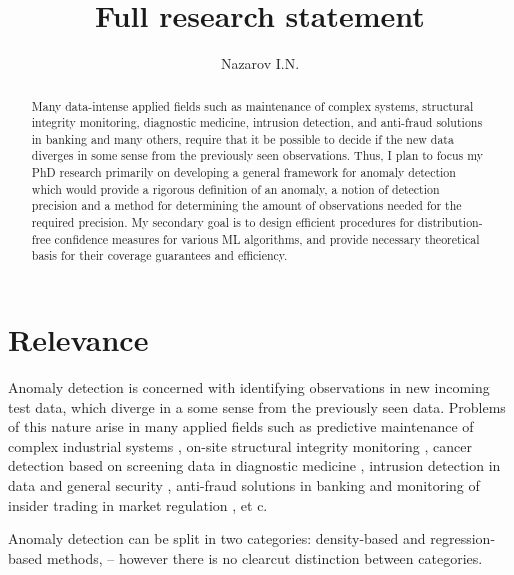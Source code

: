 \documentclass{extarticle}
\title{Full research statement}
\author{Nazarov I.N.}
\begin{document}
\maketitle
\begin{abstract}
Many data-intense applied fields such as maintenance of complex systems, structural
integrity monitoring, diagnostic medicine, intrusion detection, and anti-fraud solutions
in banking and many others, require that it be possible to decide if the new data
diverges in some sense from the previously seen observations. Thus, I plan to focus
my PhD research primarily on developing a general framework for anomaly detection
which would provide a rigorous definition of an anomaly, a notion of detection precision
and a method for determining the amount of observations needed for the required precision.
My secondary goal is to design efficient procedures for distribution-free confidence
measures for various ML algorithms, and provide necessary theoretical basis for
their coverage guarantees and efficiency.
\end{abstract}

\section{Relevance} %
\label{sec:relevance}

Anomaly detection is concerned with identifying observations in new incoming test
data, which diverge in a some sense from the previously seen data. Problems of this
nature arise in many applied fields such as predictive maintenance of complex industrial
systems \cite{tarassenko2009}, on-site structural integrity monitoring \cite{surace2010},
cancer detection based on screening data in diagnostic medicine \cite{tarassenko1995,quinn2007,clifton2011},
intrusion detection in data and general security \cite{jyothsna2011}, anti-fraud
solutions in banking and monitoring of insider trading in market regulation \cite{patcha2007},
et c.

Anomaly detection can be split in two categories: density-based and regression-based
methods, -- however there is no clearcut distinction between categories.
\end{document}
